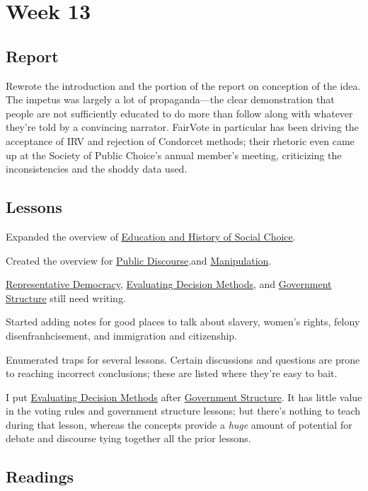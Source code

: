 
\section{Week 13}

\subsection{Report}

Rewrote the introduction and the portion of the report on conception of the idea.  The impetus was largely a lot of propaganda—the clear demonstration that people are not sufficiently educated to do more than follow along with whatever they're told by a convincing narrator.  FairVote in particular has been driving the acceptance of IRV and rejection of Condorcet methods; their rhetoric even came up at the Society of Public Choice's annual member's meeting, criticizing the inconsistencies and the shoddy data used.

\subsection{Lessons}

Expanded the overview of \hyperref[cur:ed-history]{Education and History of Social Choice}.

Created the overview for \hyperref[cur:public-discourse]{Public Discourse}.and \hyperref[cur:manipulation]{Manipulation}.

\hyperref[cur:representative-democracy]{Representative Democracy}, \hyperref[cur:evaluating-decision-methods]{Evaluating Decision Methods}, and \hyperref[cur:government-structure]{Government Structure} still need writing.

Started adding notes for good places to talk about slavery, women's rights, felony disenfranhcisement, and immigration and citizenship.

Enumerated traps for several lessons.  Certain discussions and questions are prone to reaching incorrect conclusions; these are listed where they're easy to bait.

I put \hyperref[cur:evaluating-decision-methods]{Evaluating Decision Methods} after \hyperref[cur:government-structure]{Government Structure}.  It has little value in the voting rules and government structure lessons; but there's nothing to teach during that lesson, whereas the concepts provide a \textit{huge} amount of potential for debate and discourse tying together all the prior lessons.

\subsection{Readings}

